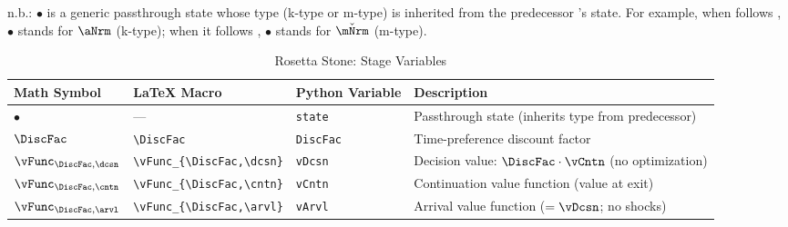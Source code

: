 \documentclass[SolvingMicroDSOPs]{subfiles}
\begin{document}
\begin{table}[h]\caption{Discounting {\Stg} ($\DiscFac$) {\Prchs}}\label{tab:prchs-disc}
\newsavebox{\disctablebox}%
\begin{center}
    \usebox{\disctablebox}

    \parbox{\wd\disctablebox}{\footnotesize n.b.: $\bullet$ is a generic passthrough state whose type (k-type or m-type) is inherited from the predecessor {\stg}'s {\Continuation} state.  For example, when  follows , $\bullet$ stands for $\aNrm$ (k-type); when it follows , $\bullet$ stands for $\check{\mNrm}$ (m-type).}
  \end{center}
  \end{table}

\begin{table}[h]
\caption{Rosetta Stone:  Stage Variables}
\label{tab:rosetta-disc}
\begin{center}
\begin{tabular}{l|l|l|l}
Math Symbol & \LaTeX{} Macro & Python Variable & Description \\
\hline
$\bullet$                    & ---                          & \texttt{state}       & Passthrough state (inherits type from predecessor) \\
$\DiscFac$                   & \verb|\DiscFac|              & \texttt{DiscFac}     & Time-preference discount factor \\
$\vFunc_{\DiscFac,\dcsn}$    & \verb|\vFunc_{\DiscFac,\dcsn}| & \texttt{vDcsn}    & Decision value: $\DiscFac \cdot \vCntn$ (no optimization) \\
$\vFunc_{\DiscFac,\cntn}$    & \verb|\vFunc_{\DiscFac,\cntn}| & \texttt{vCntn}    & Continuation value function (value at exit) \\
$\vFunc_{\DiscFac,\arvl}$    & \verb|\vFunc_{\DiscFac,\arvl}| & \texttt{vArvl}    & Arrival value function ($= \vDcsn$; no shocks) \\
\hline
\end{tabular}
\end{center}
\end{table}
\end{document}

